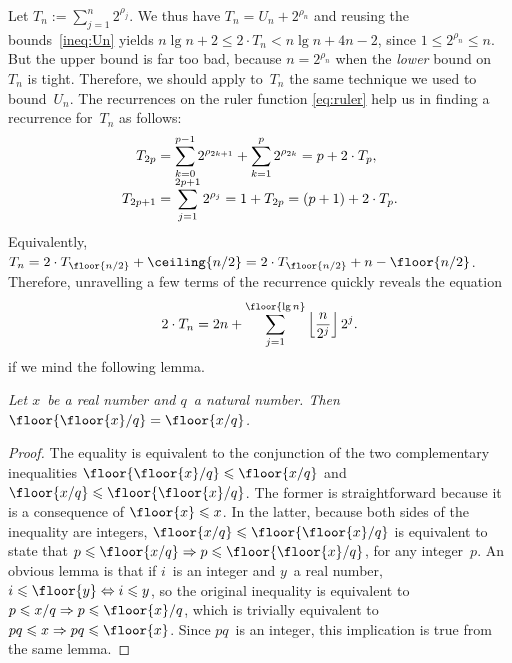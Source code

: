 Let \(T_n := \sum_{j=1}^{n}{2^{\rho_{j}}}\). We thus have \(T_n = U_n
+ 2^{\rho_n}\) and reusing the bounds~\eqref{ineq:Un} yields \(n\lg n
+ 2 \leqslant 2 \cdot T_n < n\lg n + 4n - 2\), since \(1 \leqslant
2^{\rho_n} \leqslant n\). But the upper bound is far too bad, because
\(n=2^{\rho_n}\) when the \emph{lower} bound on~\(T_n\) is
tight. Therefore, we should apply to~\(T_n\) the same technique we
used to bound~\(U_n\). The recurrences on the ruler
function \eqref{eq:ruler} help us in finding a
recurrence for~\(T_n\) as follows:
\begin{align*}
T_{2p} &= \sum_{k=0}^{\smash[t]{p-1}}{2^{\rho_{2k+1}}} +
\sum_{k=1}^{p}{2^{\rho_{2k}}} = p + 2 \cdot T_{p},\\
 T_{2p+1}
&= \sum_{j=1}^{\smash[t]{2p+1}}{2^{\rho_{j}}} = 1 + T_{2p} = (p + 1) +
2 \cdot T_{p}.
\end{align*}
Equivalently, \(T_{n} = 2 \cdot T_{\floor{n/2}} + \ceiling{n/2} = 2
\cdot T_{\floor{n/2}} + n - \floor{n/2}\). Therefore, unravelling a
few terms of the recurrence quickly reveals the equation
\begin{equation*}
2 \cdot T_n = 2n + \sum_{j=1}^{\floor{\lg n}}
            {\left\lfloor{\frac{n}{2^j}}\right\rfloor 2^j}.
\end{equation*}
if we mind the following lemma.
\begin{thm}
\label{thm:floors}
\textsl{Let \(x\)~be a real number and \(q\)~a natural number. Then
  \(\floor{\floor{x}/q} = \floor{x/q}\).}
\end{thm}
\begin{proof}
  The equality is equivalent to the conjunction of the two
  complementary inequalities \(\floor{\floor{x}/q} \leqslant
  \floor{x/q}\) and \(\floor{x/q} \leqslant \floor{\floor{x}/q}\). The
  former is straightforward because it is a consequence of \(\floor{x}
  \leqslant x\). In the latter, because both sides of the inequality
  are integers, \(\floor{x/q} \leqslant \floor{\floor{x}/q}\) is
  equivalent to state that \(p \leqslant \floor{x/q} \Rightarrow p
  \leqslant \floor{\floor{x}/q}\), for any integer~\(p\). An obvious
  lemma is that if \(i\)~is an integer and \(y\)~a real number, \(i
  \leqslant \floor{y} \Leftrightarrow i \leqslant y\), so the original
  inequality is equivalent to \(p \leqslant x/q \Rightarrow p
  \leqslant \floor{x}/q\), which is trivially equivalent to \(pq
  \leqslant x \Rightarrow pq \leqslant \floor{x}\). Since \(pq\)~is an
  integer, this implication is true from the same lemma.
\end{proof}

